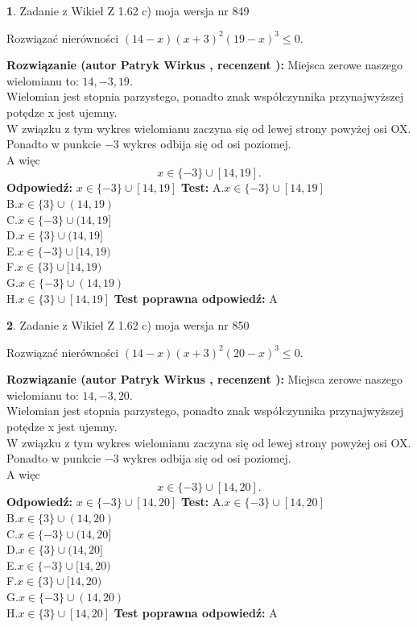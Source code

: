 \documentclass[12pt, a4paper]{article}
\theoremstyle{definition} %
\newtheorem{zad}{}
\newcommand{\zadStart}[1]{\begin{zad}#1\newline}
\newcommand{\zadStop}{\end{zad}}
\newcommand{\rozwStart}[2]{\noindent \textbf{Rozwiązanie (autor #1 , recenzent #2): }\newline}
\newcommand{\rozwStop}{\newline}
\newcommand{\odpStart}{\noindent \textbf{Odpowiedź:}\newline}
\newcommand{\odpStop}{\newline}
\newcommand{\testStart}{\noindent \textbf{Test:}\newline}
\newcommand{\testStop}{\newline}
\newcommand{\kluczStart}{\noindent \textbf{Test poprawna odpowiedź:}\newline}
\newcommand{\kluczStop}{\newline}
\begin{document}
\zadStart{Zadanie z Wikieł Z 1.62 c) moja wersja nr 849}

Rozwiązać nierówności $(14-x)(x+3)^{2}(19-x)^{3}\le0$.
\zadStop
\rozwStart{Patryk Wirkus}{}
Miejsca zerowe naszego wielomianu to: $14, -3, 19$.\\
Wielomian jest stopnia parzystego, ponadto znak współczynnika przy\linebreak najwyższej potędze x jest ujemny.\\ W związku z tym wykres wielomianu zaczyna się od lewej strony powyżej osi OX.\\
Ponadto w punkcie $-3$ wykres odbija się od osi poziomej.\\
A więc $$x \in \{-3\} \cup [14,19].$$
\rozwStop
\odpStart
$x \in \{-3\} \cup [14,19]$
\odpStop
\testStart
A.$x \in \{-3\} \cup [14,19]$\\
B.$x \in \{3\} \cup (14,19)$\\
C.$x \in \{-3\} \cup (14,19]$\\
D.$x \in \{3\} \cup (14,19]$\\
E.$x \in \{-3\} \cup [14,19)$\\
F.$x \in \{3\} \cup [14,19)$\\
G.$x \in \{-3\} \cup (14,19)$\\
H.$x \in \{3\} \cup [14,19]$
\testStop
\kluczStart
A
\kluczStop



\zadStart{Zadanie z Wikieł Z 1.62 c) moja wersja nr 850}

Rozwiązać nierówności $(14-x)(x+3)^{2}(20-x)^{3}\le0$.
\zadStop
\rozwStart{Patryk Wirkus}{}
Miejsca zerowe naszego wielomianu to: $14, -3, 20$.\\
Wielomian jest stopnia parzystego, ponadto znak współczynnika przy\linebreak najwyższej potędze x jest ujemny.\\ W związku z tym wykres wielomianu zaczyna się od lewej strony powyżej osi OX.\\
Ponadto w punkcie $-3$ wykres odbija się od osi poziomej.\\
A więc $$x \in \{-3\} \cup [14,20].$$
\rozwStop
\odpStart
$x \in \{-3\} \cup [14,20]$
\odpStop
\testStart
A.$x \in \{-3\} \cup [14,20]$\\
B.$x \in \{3\} \cup (14,20)$\\
C.$x \in \{-3\} \cup (14,20]$\\
D.$x \in \{3\} \cup (14,20]$\\
E.$x \in \{-3\} \cup [14,20)$\\
F.$x \in \{3\} \cup [14,20)$\\
G.$x \in \{-3\} \cup (14,20)$\\
H.$x \in \{3\} \cup [14,20]$
\testStop
\kluczStart
A
\kluczStop
\end{document}

